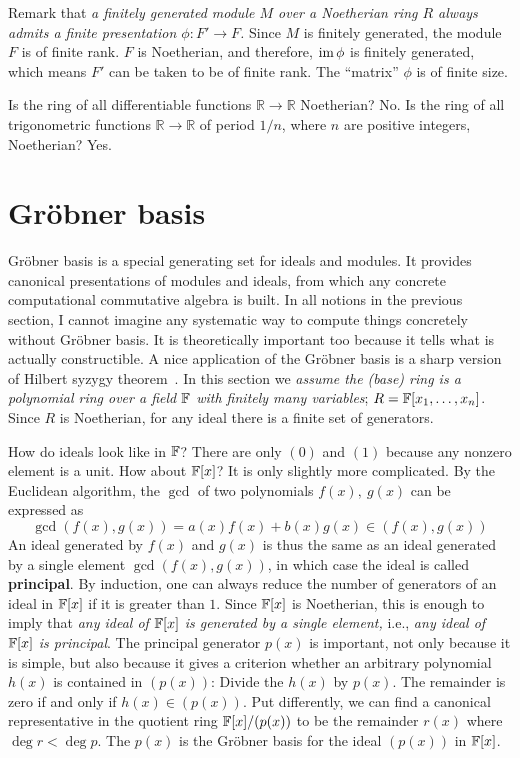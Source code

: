 Remark that {\em a finitely generated module $M$ over a Noetherian ring $R$ always admits a finite presentation $\phi : F' \to F$.}
Since $M$ is finitely generated, the module $F$ is of finite rank.
$F$ is Noetherian, and therefore, $\mathop{\mathrm{im}}\nolimits \phi$ is finitely generated, which means $F'$ can be taken to be of finite rank.
The ``matrix'' $\phi$ is of finite size.

Is the ring of all differentiable functions $\mathbb{R} \to \mathbb{R}$ Noetherian? No.
Is the ring of all trigonometric functions $\mathbb{R} \to \mathbb{R}$ of period $1/n$, where $n$ are positive integers, Noetherian? Yes.

\section{Gr\"obner basis}

Gr\"obner basis is a special generating set for ideals and modules.
It provides canonical presentations of modules and ideals, from which any concrete computational commutative algebra is built.
In all notions in the previous section,
I cannot imagine any systematic way to compute things concretely without Gr\"obner basis.
It is theoretically important too because it tells what is actually constructible.
A nice application of the Gr\"obner basis is a sharp version of Hilbert syzygy theorem~\cite[Corollary~15.11]{Eisenbud}.
In this section we {\em assume the (base) ring is a polynomial ring over a field $\mathbb{F}$ with finitely many variables};
$R = \mathbb{F}[x_1,\ldots,x_n]$.
Since $R$ is Noetherian, for any ideal there is a finite set of generators.

How do ideals look like in $\mathbb{F}$? There are only $(0)$ and $(1)$ because any nonzero element is a unit.
How about $\mathbb{F}[x]$? It is only slightly more complicated.
By the Euclidean algorithm, the $\gcd$ of two polynomials $f(x),~g(x)$ can be expressed as
\[
 \gcd( f(x), g(x) ) = a(x) f(x) + b(x) g(x) \in (f(x),g(x))
\]
An ideal generated by $f(x)$ and $g(x)$ is thus the same as an ideal generated by a single element $\gcd(f(x),g(x))$, 
in which case the ideal is called {\bf principal}.
By induction, one can always reduce the number of generators of an ideal in $\mathbb{F}[x]$ if it is greater than $1$.
Since $\mathbb{F}[x]$ is Noetherian, this is enough to imply that {\em any ideal of $\mathbb{F}[x]$ is generated by a single element,}
i.e., {\em any ideal of $\mathbb{F}[x]$ is principal}.
The principal generator $p(x)$ is important, not only because it is simple, but also because it gives a criterion
whether an arbitrary polynomial $h(x)$ is contained in $(p(x))$:
Divide the $h(x)$ by $p(x)$. The remainder is zero if and only if $h(x) \in (p(x))$.
Put differently, we can find a canonical representative in the quotient ring $\mathbb{F}[x]/(p(x))$
to be the remainder $r(x)$  where $\deg r < \deg p$.
The $p(x)$ is the Gr\"obner basis for the ideal $(p(x))$ in $\mathbb{F}[x]$.

